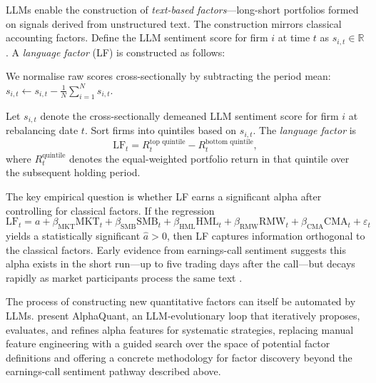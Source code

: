 LLMs enable the construction of \emph{text-based factors}---long-short portfolios
formed on signals derived from unstructured text. The construction mirrors classical
accounting factors. Define the LLM sentiment score for firm $i$ at time $t$ as $s_{i,t}
\in \mathbb{R}$. A \emph{language factor} (LF) is constructed as follows:

We normalise raw scores cross-sectionally by subtracting the period mean: $s_{i,t} \leftarrow s_{i,t} - \frac{1}{N}\sum_{i=1}^N s_{i,t}$.

\begin{definition}
\label{def:language-factor}
Let $s_{i,t}$ denote the cross-sectionally demeaned LLM sentiment score for firm $i$
at rebalancing date $t$. Sort firms into quintiles based on $s_{i,t}$.
The \emph{language factor} is
\begin{equation}
  \text{LF}_t = R_t^{\text{top quintile}} - R_t^{\text{bottom quintile}},
  \label{eq:ch10-language-factor}
\end{equation}
where $R_t^{\text{quintile}}$ denotes the equal-weighted portfolio return in that quintile
over the subsequent holding period.
\end{definition}

The key empirical question is whether LF earns a significant alpha after controlling
for classical factors. If the regression
\begin{equation}
  \text{LF}_t = a + \beta_{\text{MKT}} \text{MKT}_t + \beta_{\text{SMB}} \text{SMB}_t
  + \beta_{\text{HML}} \text{HML}_t + \beta_{\text{RMW}} \text{RMW}_t
  + \beta_{\text{CMA}} \text{CMA}_t + \varepsilon_t
  \label{eq:ch10-lf-alpha-regression}
\end{equation}
yields a statistically significant $\hat{a} > 0$, then LF captures information
orthogonal to the classical factors. Early evidence from earnings-call sentiment suggests
this alpha exists in the short run---up to five trading days after the call---but decays
rapidly as market participants process the same text \citep{tetlock2007giving,
LopezLiraTang2023}.

The process of constructing new quantitative factors can itself be automated by LLMs.
\citet{YukselAlphaQuant2025} present AlphaQuant, an LLM-evolutionary loop that
iteratively proposes, evaluates, and refines alpha features for systematic strategies,
replacing manual feature engineering with a guided search over the space of potential
factor definitions and offering a concrete methodology for factor discovery beyond the
earnings-call sentiment pathway described above.

